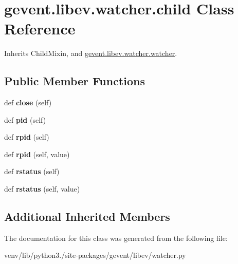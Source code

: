 \hypertarget{classgevent_1_1libev_1_1watcher_1_1child}{}\section{gevent.\+libev.\+watcher.\+child Class Reference}
\label{classgevent_1_1libev_1_1watcher_1_1child}


Inherits Child\+Mixin, and \hyperlink{classgevent_1_1libev_1_1watcher_1_1watcher}{gevent.\+libev.\+watcher.\+watcher}.

\subsection*{Public Member Functions}
\begin{DoxyCompactItemize}
\item 
\mbox{\label{classgevent_1_1libev_1_1watcher_1_1child_a21da5cd8d0aacc3178dfafe3c61bf581}} 
def {\bfseries close} (self)
\item 
\mbox{\label{classgevent_1_1libev_1_1watcher_1_1child_ad29ba85f44fc3a3008088ddef96d09ba}} 
def {\bfseries pid} (self)
\item 
\mbox{\label{classgevent_1_1libev_1_1watcher_1_1child_aa175188b5003f6e8ecbc6fc686248354}} 
def {\bfseries rpid} (self)
\item 
\mbox{\label{classgevent_1_1libev_1_1watcher_1_1child_aeb6380638347478e446aeaa5cedde179}} 
def {\bfseries rpid} (self, value)
\item 
\mbox{\label{classgevent_1_1libev_1_1watcher_1_1child_a475e8132714a5a44145ce2a9850b98b4}} 
def {\bfseries rstatus} (self)
\item 
\mbox{\label{classgevent_1_1libev_1_1watcher_1_1child_a496d11a652feacbdb24e19fca7f25925}} 
def {\bfseries rstatus} (self, value)
\end{DoxyCompactItemize}
\subsection*{Additional Inherited Members}


The documentation for this class was generated from the following file\+:\begin{DoxyCompactItemize}
\item 
venv/lib/python3./site-\/packages/gevent/libev/watcher.\+py\end{DoxyCompactItemize}
